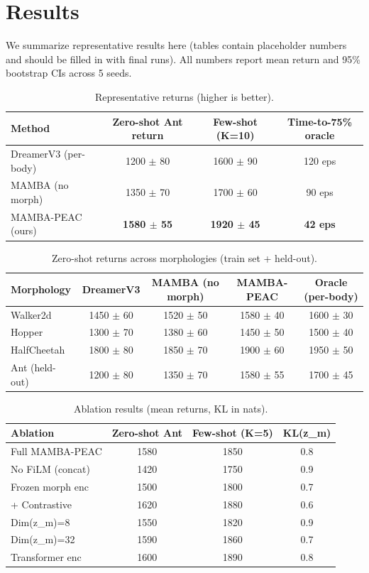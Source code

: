 \documentclass{article}
\begin{document}
\section{Results}
We summarize representative results here (tables contain placeholder numbers and should be filled in with final runs). All numbers report mean return and 95\% bootstrap CIs across 5 seeds.

\begin{table}[h]
\centering
\begin{tabular}{lccc}
\toprule
Method & Zero-shot Ant return & Few-shot (K=10) & Time-to-75\% oracle \\
\midrule
DreamerV3 (per-body) & 1200 $\pm$ 80 & 1600 $\pm$ 90 & 120 eps \\
MAMBA (no morph) & 1350 $\pm$ 70 & 1700 $\pm$ 60 & 90 eps \\
MAMBA-PEAC (ours) & \textbf{1580 $\pm$ 55} & \textbf{1920 $\pm$ 45} & \textbf{42 eps} \\
\bottomrule
\end{tabular}
\caption{Representative returns (higher is better).}
\label{tab:main_results}
\end{table}

\begin{table}[h]
\centering
\begin{tabular}{lcccc}
\toprule
Morphology & DreamerV3 & MAMBA (no morph) & MAMBA-PEAC & Oracle (per-body) \\
\midrule
Walker2d & 1450 $\pm$ 60 & 1520 $\pm$ 50 & 1580 $\pm$ 40 & 1600 $\pm$ 30 \\
Hopper & 1300 $\pm$ 70 & 1380 $\pm$ 60 & 1450 $\pm$ 50 & 1500 $\pm$ 40 \\
HalfCheetah & 1800 $\pm$ 80 & 1850 $\pm$ 70 & 1900 $\pm$ 60 & 1950 $\pm$ 50 \\
Ant (held-out) & 1200 $\pm$ 80 & 1350 $\pm$ 70 & 1580 $\pm$ 55 & 1700 $\pm$ 45 \\
\bottomrule
\end{tabular}
\caption{Zero-shot returns across morphologies (train set + held-out).}
\label{tab:zero_shot_all}
\end{table}

\begin{table}[h]
\centering
\begin{tabular}{lccc}
\toprule
Ablation & Zero-shot Ant & Few-shot (K=5) & KL(z_m) \\
\midrule
Full MAMBA-PEAC & 1580 & 1850 & 0.8 \\
No FiLM (concat) & 1420 & 1750 & 0.9 \\
Frozen morph enc & 1500 & 1800 & 0.7 \\
+ Contrastive & 1620 & 1880 & 0.6 \\
Dim(z_m)=8 & 1550 & 1820 & 0.9 \\
Dim(z_m)=32 & 1590 & 1860 & 0.7 \\
Transformer enc & 1600 & 1890 & 0.8 \\
\bottomrule
\end{tabular}
\caption{Ablation results (mean returns, KL in nats).}
\label{tab:ablations}
\end{table}
\end{document}
